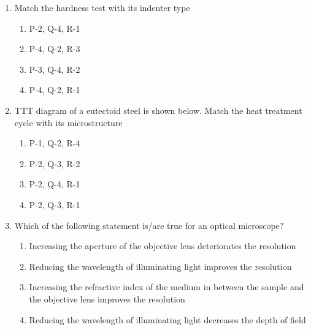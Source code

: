 \documentclass[journal]{IEEEtran}
\numberwithin{equation}{enumi}
\numberwithin{figure}{enumi}
\begin{document}
\begin{enumerate}
	\item Match the hardness test  with its indenter type 
		\begin{table}[H]
			\centering 
			
		\end{table}

		\hfill{}

		\begin{enumerate}
			\item P-2, Q-4, R-1
			\item P-4, Q-2, R-3
			\item P-3, Q-4, R-2
			\item P-4, Q-2, R-1
		\end{enumerate}

	\item TTT diagram of a eutectoid steel is shown below. Match the heat treatment cycle  with its microstructure 
		
		\begin{figure}[H]
			\centering 
			\resizebox{0.5\textwidth}{!}{}
		\end{figure}

		\begin{table}[H]
			\centering
			
		\end{table}

		\hfill{}

		\begin{enumerate}
			\item P-1, Q-2, R-4
			\item P-2, Q-3, R-2
			\item P-2, Q-4, R-1
			\item P-2, Q-3, R-1
		\end{enumerate}

	\item Which of the following statement is/are true for an optical microscope?
		
		\hfill{}

		\begin{enumerate}
			\item Increasing the aperture of the objective lens deteriorates the resolution
			\item Reducing the wavelength of illuminating light improves the resolution
			\item Increasing the refractive index of the medium in between the sample and the objective lens improves the resolution
			\item Reducing the wavelength of illuminating light decreases the depth of field
		\end{enumerate}


\end{enumerate}
\end{document}
